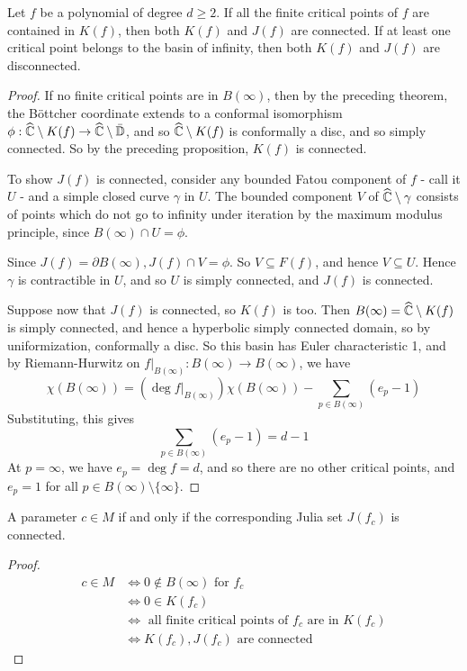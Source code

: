 \documentclass[10pt,a4paper]{article}
\begin{document}
\begin{proposition}
  Let $f$ be a polynomial of degree $d \geq 2$. If all the finite critical points of $f$ are contained in $K(f)$, then both $K(f)$ and $J(f)$ are connected. If at least one critical point belongs to the basin of infinity, then both $K(f)$ and $J(f)$ are disconnected.
\end{proposition}
\begin{proof}
  If no finite critical points are in $B(\infty)$, then by the preceding theorem, the B\"ottcher coordinate extends to a conformal isomorphism $\phi: \widehat{\mathbb{C}}\setminus K(f) \to \widehat{\mathbb{C}}\setminus \bar{\mathbb{D}}$, and so $\widehat{\mathbb{C}}\setminus K(f)$ is conformally a disc, and so simply connected. So by the preceding proposition, $K(f)$ is connected.

  To show $J(f)$ is connected, consider any bounded Fatou component of $f$ - call it $U$ - and a simple closed curve $\gamma$ in $U$. The bounded component $V$ of $\widehat{\mathbb{C}}\setminus\gamma$ consists of points which do not go to infinity under iteration by the maximum modulus principle, since $B(\infty) \cap U = \phi$.

  Since $J(f) = \partial B(\infty), J(f)\cap V = \phi$. So $V \subseteq F(f)$, and hence $V \subseteq U$. Hence $\gamma$ is contractible in $U$, and so $U$ is simply connected, and $J(f)$ is connected.

  Suppose now that $J(f)$ is connected, so $K(f)$ is too. Then $B(\infty) = \widehat{\mathbb{C}} \setminus K(f)$ is simply connected, and hence a hyperbolic simply connected domain, so by uniformization, conformally a disc. So this basin has Euler characteristic 1, and by Riemann-Hurwitz on $f|_{B(\infty)} : B(\infty) \to B(\infty)$, we have
  \[\chi(B(\infty)) = (\deg f|_{B(\infty)})\chi(B(\infty)) - \sum_{p\in B(\infty)} (e_p - 1)\]
  Substituting, this gives
  \[\sum_{p \in B(\infty)} (e_p-1) = d-1\]
  At $p = \infty$, we have $e_p = \deg f = d$, and so there are no other critical points, and $e_p = 1$ for all $p \in B(\infty)\setminus \{\infty\}$.
\end{proof}
\begin{corollary}
  A parameter $c \in M$ if and only if the corresponding Julia set $J(f_c)$ is connected.
\end{corollary}
\begin{proof}
  \begin{align*}
    c \in M &\iff 0 \notin B(\infty) \text{ for }f_c\\
    &\iff 0 \in K(f_c)\\
    &\iff \text{ all finite critical points of $f_c$ are in $K(f_c)$}\\
    &\iff K(f_c), J(f_c) \text{ are connected}
  \end{align*}
\end{proof}
\end{document}

